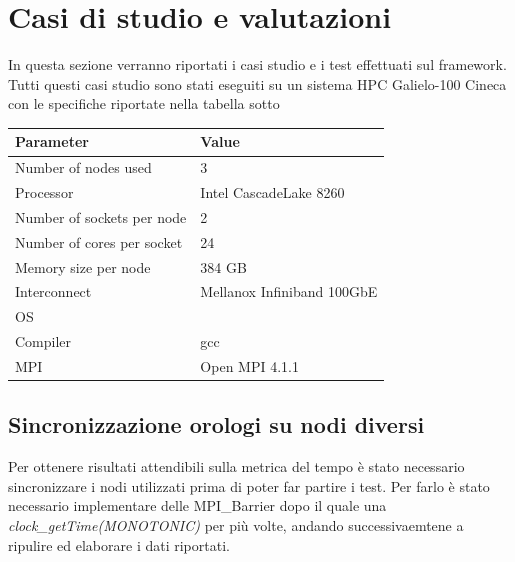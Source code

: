 \chapter{Casi di studio e valutazioni}
\noindent In questa sezione verranno riportati i casi studio e i test effettuati sul framework. Tutti questi casi studio sono stati eseguiti su un sistema HPC Galielo-100 Cineca con le specifiche riportate nella tabella sotto

\vspace{.7cm}
\begin{center}

\begin{tabular}{l|l}
    \hline
    \textbf{Parameter} & \textbf{Value} \\
    \hline
    Number of nodes used & 3 \\
    \hline
    Processor & Intel CascadeLake 8260 \\
    \hline
    Number of sockets per node & 2 \\
    \hline
    Number of cores per socket & 24 \\
    \hline
    Memory size per node & 384 GB \\
    \hline
    Interconnect & Mellanox Infiniband 100GbE \\
    \hline
    OS &  \\
    \hline
    Compiler & gcc \\
    \hline
    MPI & Open MPI  4.1.1 \\
    \hline
\end{tabular}
\end{center}
\section{Sincronizzazione orologi su nodi diversi}
Per ottenere risultati attendibili sulla metrica del tempo è stato necessario sincronizzare i nodi utilizzati prima di poter far partire i test. Per farlo è stato necessario implementare delle MPI\_Barrier dopo il quale una \emph{clock\_getTime(MONOTONIC)} per più volte, andando successivaemtene a ripulire ed elaborare i dati riportati.

